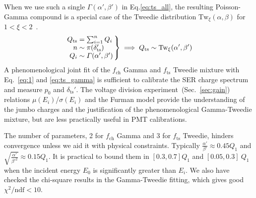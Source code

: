 When we use such a single \(\varGamma(\alpha', \beta')\) in Eq.\eqref{eq:ts_all},
the resulting Poisson-Gamma compound is a special case of the Tweedie distribution $\mathrm{Tw}_{\xi}(\alpha,\beta)$
for $1<\xi<2$~\cite{1991Tweedie}.
\begin{equation}
	\arraycolsep=1.4pt
	\label{eq:ts_gamma}
	\left.\begin{array}{rl}
		Q_{\text{ts}} & = \sum_{{i}=1}^{n} Q_{i}                 \\
		n             & \sim \mathrm{\pi}(\delta_{\mathrm{ts}}') \\
		Q_{i}         & \sim \varGamma(\alpha', \beta')
	\end{array}\right\} \implies
	Q_{\text{ts}} \sim \mathrm{Tw}_{\xi}(\alpha',\beta')
\end{equation}
A phenomenological joint fit of the \(f_\mathrm{ch}\) Gamma and \(f_\mathrm{ts}\) Tweedie
mixture with Eq.~\eqref{eq:1} and \eqref{eq:ts_gamma} is sufficient to calibrate the SER charge spectrum and measure \(p_0\) and \(\delta_\text{ts}'\).
The voltage division experiment~(Sec.~\ref{sec:gain}) relations \(\mu(E_i)\)/\(\sigma(E_i)\) and the Furman model provide the understanding of the jumbo charges and the justification of the phenomenological Gamma-Tweedie
mixture, but are less practically useful in PMT calibrations.

The number of parameters, 2 for \(f_\mathrm{ch}\) Gamma and 3 for \(f_\mathrm{ts}\) Tweedie,
hinders convergence unless we aid it with physical constraints.
Typically $\frac{\alpha'}{\beta'}\approx 0.45Q_1$ and \(\sqrt{\frac{\alpha'}{\beta'^2}}\approx 0.15Q_1\).
It is practical to bound them in $[0.3,0.7]Q_1$ and $[0.05,0.3]~Q_1$ when the incident energy $E_0$ is significantly greater than $E_{i}$.
We also have checked the chi-square results in the Gamma-Tweedie fitting,
which gives good $\chi^2/\mathrm{ndf}<10$.
